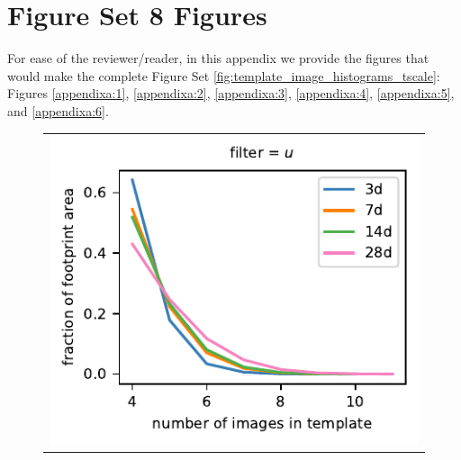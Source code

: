 \documentclass[preprintm,linenumbers]{aastex631}
\begin{document}
		\appendix
  
		\section{Figure Set 8 Figures}
		
		For ease of the reviewer/reader, in this appendix we provide the figures that would make the complete Figure Set \ref{fig:template_image_histograms_tscale}: Figures \ref{appendixa:1}, \ref{appendixa:2}, \ref{appendixa:3}, \ref{appendixa:4}, \ref{appendixa:5}, and \ref{appendixa:6}. 
  
		
		\begin{figure}[h]
			\centering
%				
%				
					\begin{tabular}{@{}c@{}c@{}}
			\multicolumn{2}{c}{	\includegraphics{results/histograms_templates_tscale/hist_first_year_one_snap_v4_0_10yrs_db_noDD_noTwi_doALLTemplateMetrics_reduceNTemplate_u_noDD_noTwi.pdf}} \\

\end{tabular}
\end{figure}
\end{document}
